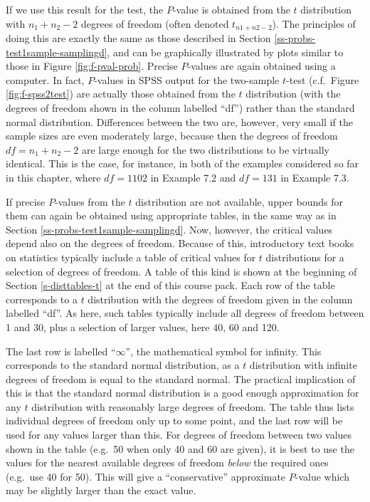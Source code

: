 \documentclass[11pt,a4paper,openany]{book}
\begin{document}
If we use this result for the test, the \(P\)-value is obtained from the
\(t\) distribution with \(n_{1}+n_{2}-2\) degrees of freedom (often
denoted \(t_{n1+n2-2}\)). The principles of doing this are exactly the
same as those described in Section \ref{ss-probs-test1sample-samplingd},
and can be graphically illustrated by plots similar to those in Figure
\ref{fig:f-pval-prob}. Precise \(P\)-values are again obtained using a
computer. In fact, \(P\)-values in SPSS output for the two-sample
\(t\)-test (c.f.~Figure \ref{fig:f-spss2test}) are actually those
obtained from the \(t\) distribution (with the degrees of freedom shown
in the column labelled ``df'') rather than the standard normal
distribution. Differences between the two are, however, very small if
the sample sizes are even moderately large, because then the degrees of
freedom \(df=n_{1}+n_{2}-2\) are large enough for the two distributions
to be virtually identical. This is the case, for instance, in both of
the examples considered so far in this chapter, where \(df=1102\) in
Example 7.2 and \(df=131\) in Example 7.3.

If precise \(P\)-values from the \(t\) distribution are not available,
upper bounds for them can again be obtained using appropriate tables, in
the same way as in Section \ref{ss-probs-test1sample-samplingd}. Now,
however, the critical values depend also on the degrees of freedom.
Because of this, introductory text books on statistics typically include
a table of critical values for \(t\) distributions for a selection of
degrees of freedom. A table of this kind is shown at the beginning of
Section \ref{s-disttables-t} at the end of this course pack. Each row of
the table corresponds to a \(t\) distribution with the degrees of
freedom given in the column labelled ``df''. As here, such tables
typically include all degrees of freedom between 1 and 30, plus a
selection of larger values, here 40, 60 and 120.

The last row is labelled ``\(\infty\)'', the mathematical symbol for
infinity. This corresponds to the standard normal distribution, as a
\(t\) distribution with infinite degrees of freedom is equal to the
standard normal. The practical implication of this is that the standard
normal distribution is a good enough approximation for any \(t\)
distribution with reasonably large degrees of freedom. The table thus
lists individual degrees of freedom only up to some point, and the last
row will be used for any values larger than this. For degrees of freedom
between two values shown in the table (e.g.~50 when only 40 and 60 are
given), it is best to use the values for the nearest available degrees
of freedom \emph{below} the required ones (e.g.~use 40 for 50). This
will give a ``conservative'' approximate \(P\)-value which may be
slightly larger than the exact value.
\end{document}
